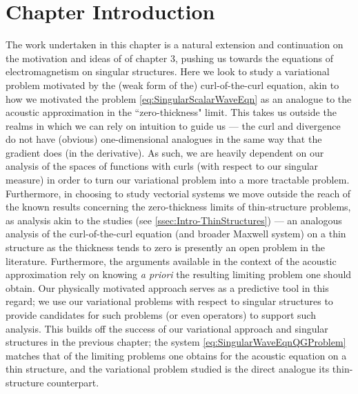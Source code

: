 \section{Chapter Introduction} \label{sec:Curl-Intro}
The work undertaken in this chapter is a natural extension and continuation on the motivation and ideas of of chapter 3, pushing us towards the equations of electromagnetism on singular structures.
Here we look to study a variational problem motivated by the (weak form of the) curl-of-the-curl equation, akin to how we motivated the problem \eqref{eq:SingularScalarWaveEqn} as an analogue to the acoustic approximation in the ``zero-thickness" limit.
This takes us outside the realms in which we can rely on intuition to guide us --- the curl and divergence do not have (obvious) one-dimensional analogues in the same way that the gradient does (in the derivative).
As such, we are heavily dependent on our analysis of the spaces of functions with curls (with respect to our singular measure) in order to turn our variational problem into a more tractable problem.
Furthermore, in choosing to study vectorial systems we move outside the reach of the known results concerning the zero-thickness limits of thin-structure problems, as analysis akin to the studies \cite{kuchment2001convergence, kuchment2003asymptotics, exner2005convergence, post2012spectral} (see \ref{ssec:Intro-ThinStructures}) --- an analogous analysis of the curl-of-the-curl equation (and broader Maxwell system) on a thin structure as the thickness tends to zero is presently an open problem in the literature.
Furthermore, the arguments available in the context of the acoustic approximation rely on knowing \emph{a priori} the resulting limiting problem one should obtain.
Our physically motivated approach serves as a predictive tool in this regard; we use our variational problems with respect to singular structures to provide candidates for such problems (or even operators) to support such analysis.
This builds off the success of our variational approach and singular structures in the previous chapter; the system \eqref{eq:SingularWaveEqnQGProblem} matches that of the limiting problems one obtains for the acoustic equation on a thin structure, and the variational problem studied is the direct analogue its thin-structure counterpart.

